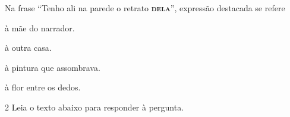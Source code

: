 \begin{myquote}

\end{myquote}

Na frase ``Tenho ali na parede o retrato \textsc{\textbf{dela}}'', expressão destacada
se refere

\begin{escolha}

  \item à mãe do narrador.
  
  \item à outra casa. 
  
  \item à pintura que assombrava.
  
  \item à flor entre os dedos.

\end{escolha}


\num{2} Leia o texto abaixo para responder à pergunta.

